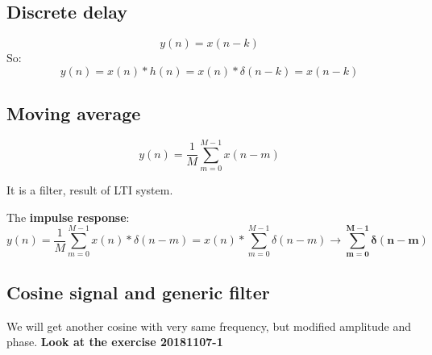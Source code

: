 \subsection{Discrete delay}
$$y(n)=x(n-k)$$
So:
$$y(n)=x(n)*h(n)=x(n)*\delta(n-k)=x(n-k)$$

\subsection{Moving average}
\begin{LARGE}
    $$
    y(n)=\frac{1}{M}\sum_{m=0}^{M-1}x(n-m)
    $$
\end{LARGE}
It is a filter, result of LTI system.

The \textbf{impulse response}:
$$y(n)=\frac{1}{M}\sum_{m=0}^{M-1}x(n)*\delta(n-m)=x(n)*\sum_{m=0}^{M-1}\delta(n-m)\rightarrow \mathbf{\sum_{m=0}^{M-1}\delta(n-m)}$$

\subsection{Cosine signal and generic filter}
We will get another cosine with very same frequency, but modified amplitude and phase. \textbf{Look at the exercise 20181107-1}